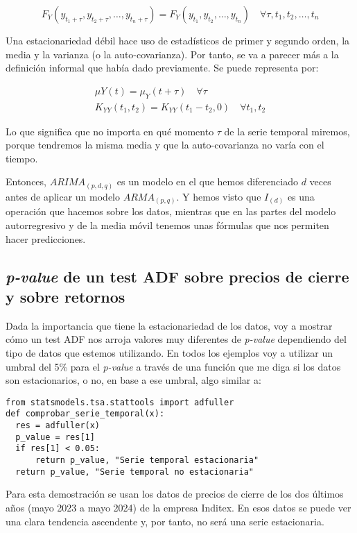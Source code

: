 \begin{equation}
	F_{Y}(y_{t_{1}+\tau}, y_{t_{2}+\tau}, \ldots, y_{t_{n}+\tau}) = F_{Y}(y_{t_{1}}, y_{t_{2}}, \ldots, y_{t_{n}}) \quad \forall \tau, t_{1}, t_{2}, \ldots, t_{n}
\end{equation}

Una estacionariedad débil hace uso de estadísticos de primer y segundo orden, la media y la varianza (o la auto-covarianza). Por tanto, se va a parecer más a la definición informal que había dado previamente. Se puede representa por:

\begin{align}
	\mu{Y}(t) = \mu_{Y}(t + \tau) \quad \forall \tau \\
	K_{YY}(t_{1},t_{2}) = K_{YY}(t_{1} - t_{2}, 0) \quad \forall t_{1}, t_{2}
\end{align}

Lo que significa que no importa en qué momento $\tau$ de la serie temporal miremos, porque tendremos la misma media y que la auto-covarianza no varía con el tiempo.

Entonces, $ARIMA_{(p, d, q)}$ es un modelo en el que hemos diferenciado $d$ veces antes de aplicar un modelo $ARMA_{(p, q)}$. Y hemos visto que $I_{(d)}$ es una operación que hacemos sobre los datos, mientras que en las partes del modelo autorregresivo y de la media móvil tenemos unas fórmulas que nos permiten hacer predicciones. 


\subsection{\emph{p-value} de un test ADF sobre precios de cierre y sobre retornos}

Dada la importancia que tiene la estacionariedad de los datos, voy a mostrar cómo un test ADF nos arroja valores muy diferentes de \emph{p-value} dependiendo del tipo de datos que estemos utilizando. En todos los ejemplos voy a utilizar un umbral del 5\% para el \emph{p-value} a través de una función que me diga si los datos son estacionarios, o no, en base a ese umbral, algo similar a:

\begin{verbatim}
from statsmodels.tsa.stattools import adfuller
def comprobar_serie_temporal(x):
  res = adfuller(x)
  p_value = res[1]
  if res[1] < 0.05:
  	  return p_value, "Serie temporal estacionaria"
  return p_value, "Serie temporal no estacionaria"
\end{verbatim}

Para esta demostración se usan los datos de precios de cierre de los dos últimos años (mayo 2023 a mayo 2024) de la empresa Inditex. En esos datos se puede ver una clara tendencia ascendente y, por tanto, no será una serie estacionaria. 

